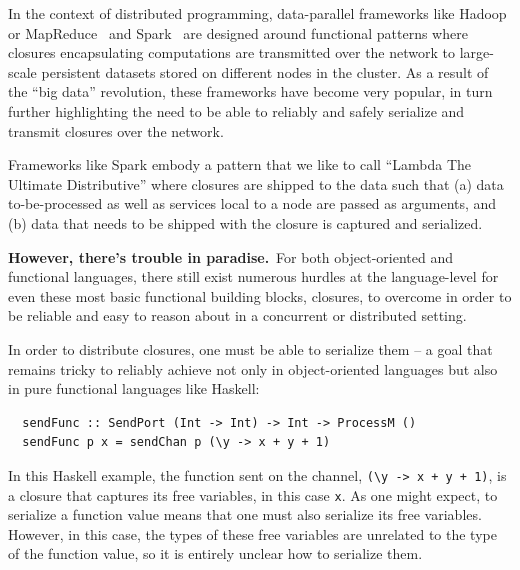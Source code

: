 \documentclass{llncs}
\begin{document}

In the context of distributed programming, data-parallel frameworks like
Hadoop or MapReduce~\cite{MapReduce} and Spark~\cite{Spark} are designed
around functional patterns where closures encapsulating computations are
transmitted over the network to large-scale persistent datasets stored on
different nodes in the cluster. As a result of the ``big data'' revolution,
these frameworks have become very popular, in turn further highlighting the
need to be able to reliably and safely serialize and transmit closures over
the network.


Frameworks like Spark embody a pattern that we like to call ``Lambda The
Ultimate Distributive'' where closures are shipped to the data such that (a)
data to-be-processed as well as services local
to a node are passed as arguments, and (b) data that needs to
be shipped with the closure is captured and serialized.


{\bf However, there's trouble in paradise.}~For both object-oriented and
functional languages, there still exist numerous hurdles at the language-level
for even these most basic functional building blocks, closures, to overcome in
order to be reliable and easy to reason about in a concurrent or distributed
setting.

In order to distribute closures, one must be able to serialize them -- a goal
that remains tricky to reliably achieve not only in object-oriented
languages but also in pure functional languages like Haskell:

\begin{lstlisting}
  sendFunc :: SendPort (Int -> Int) -> Int -> ProcessM ()
  sendFunc p x = sendChan p (\y -> x + y + 1)
\end{lstlisting}

In this Haskell example, the function sent on the channel,
\verb|(\y -> x + y + 1)|,
is a closure that captures its free variables, in this case \verb|x|.
As one might expect, to serialize a function value means that one must also
serialize its free variables. However, in this case, the types of these free
variables are unrelated to the type of the function value, so it is entirely
unclear how to serialize them.
\end{document}
